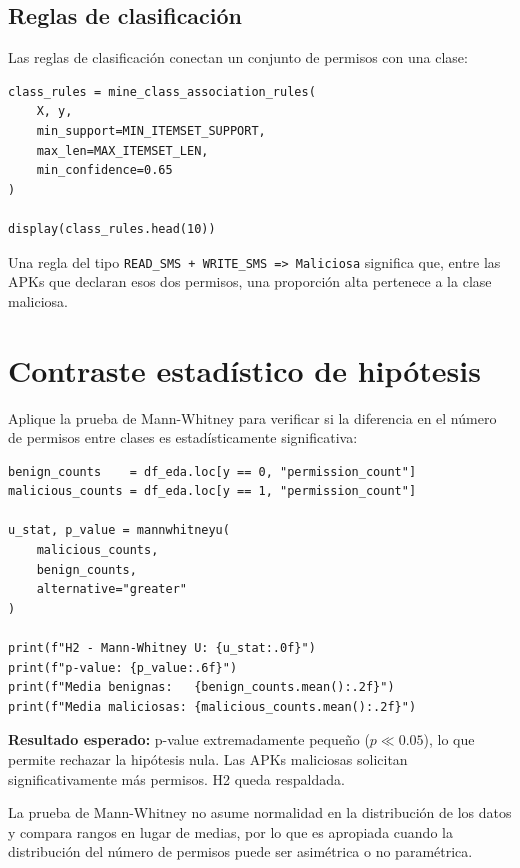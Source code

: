 \documentclass[
  coursetitle={Cómputo Nube y Tecnologías Emergentes},
  coursehours={96},
  coursedate={Verano 2026},
  doctype={Tutorial},
  otherlangs={english,french},
  authorname={Lázaro},
  authorsurname={Bustio-Martínez},
  authortitle={PhD},
  role={Profesor Investigador},
  email={lbustio@inaoe.mx},
  phone={5559504000},
  ext={7459},
  institution={Instituto Nacional de Astrofísica, Óptica y Electrónica (INAOE)},
  department={Maestría en Ciencias en Tecnologías de Seguridad},
  address={Luis Enrique Erro 1, Sta. Ma. Tonantzintla, San Andrés Cholula, CP 72840, Puebla, México},
  margin={0.5in}
]{../../lbustio_lecture_notes}
\begin{document}
\subsection{Reglas de clasificación}

Las reglas de clasificación conectan un conjunto de permisos con una clase:

\begin{lstlisting}
class_rules = mine_class_association_rules(
    X, y,
    min_support=MIN_ITEMSET_SUPPORT,
    max_len=MAX_ITEMSET_LEN,
    min_confidence=0.65
)

display(class_rules.head(10))
\end{lstlisting}

Una regla del tipo \texttt{READ\_SMS + WRITE\_SMS => Maliciosa} significa que, entre las APKs que declaran esos dos permisos, una proporción alta pertenece a la clase maliciosa.

\section{Contraste estadístico de hipótesis}

Aplique la prueba de Mann-Whitney para verificar si la diferencia en el número de permisos entre clases es estadísticamente significativa:

\begin{lstlisting}
benign_counts    = df_eda.loc[y == 0, "permission_count"]
malicious_counts = df_eda.loc[y == 1, "permission_count"]

u_stat, p_value = mannwhitneyu(
    malicious_counts,
    benign_counts,
    alternative="greater"
)

print(f"H2 - Mann-Whitney U: {u_stat:.0f}")
print(f"p-value: {p_value:.6f}")
print(f"Media benignas:   {benign_counts.mean():.2f}")
print(f"Media maliciosas: {malicious_counts.mean():.2f}")
\end{lstlisting}

\textbf{Resultado esperado:} p-value extremadamente pequeño ($p \ll 0.05$), lo que permite rechazar la hipótesis nula. Las APKs maliciosas solicitan significativamente más permisos. H2 queda respaldada.

\begin{tcolorbox}[title=Por qué Mann-Whitney]
La prueba de Mann-Whitney no asume normalidad en la distribución de los datos y compara rangos en lugar de medias, por lo que es apropiada cuando la distribución del número de permisos puede ser asimétrica o no paramétrica.
\end{tcolorbox}
\end{document}
